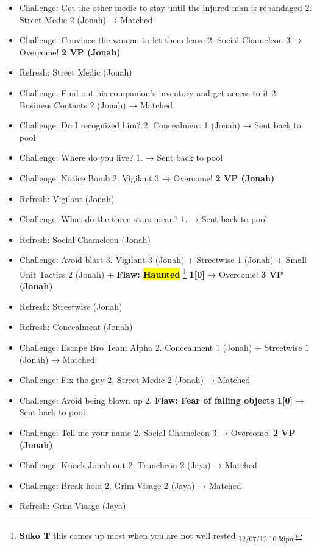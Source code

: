 {
\parskip=0pt
\begin{itemize}
\item Challenge: Get the other medic to stay until the injured man is rebandaged 2.  Street Medic 2 (Jonah) → Matched
\item Challenge: Convince the woman to let them leave 2.  Social Chameleon 3 → Overcome! \textbf{2 VP (Jonah)}
\item Refresh: Street Medic (Jonah)
\item Challenge: Find out his companion's inventory and get access to it 2. Business Contacts 2 (Jonah) → Matched
\item Challenge: Do I recognized him? 2.  Concealment 1 (Jonah) → Sent back to pool
\item Challenge: Where do you live? 1. → Sent back to pool
\item Challenge: Notice Bomb 2. Vigilant 3 → Overcome! \textbf{2 VP (Jonah)}
\item Refresh: Vigilant (Jonah)
\item Challenge: What do the three stars mean? 1. → Sent back to pool
\item Refresh: Social Chameleon (Jonah)
\item Challenge: Avoid blast 3. Vigilant 3 (Jonah) + Streetwise 1 (Jonah) + Small Unit Tactics 2 (Jonah) + \textbf{ {\color[RGB]{255,0,0}Flaw: } }\textbf{ {\color[RGB]{255,0,0}\hl{Haunted}} }\footnote{\textbf{Suko T }this comes up most when you are not well rested \textsubscript{12/07/12 10:59pm}}\textbf{ {\color[RGB]{255,0,0} 1{[}0{]}} } → Overcome! \textbf{3 VP (Jonah)}
\item Refresh: Streetwise (Jonah)
\item Refresh: Concealment (Jonah)
\item Challenge: Escape Bro Team Alpha 2. Concealment 1 (Jonah) + Streetwise 1 (Jonah) → Matched
\item Challenge: Fix the guy 2.  Street Medic 2 (Jonah) → Matched
\item Challenge: Avoid being blown up 2. \textbf{ {\color[RGB]{255,0,0}Flaw: Fear of falling objects 1{[}0{]}} } → Sent back to pool
\item Challenge: Tell me your name 2. Social Chameleon 3 → Overcome! \textbf{2 VP (Jonah)}
\item Challenge: Knock Jonah out 2. Truncheon 2 (Jaya) → Matched
\item Challenge: Break hold 2. Grim Visage 2 (Jaya) → Matched
\item Refresh: Grim Visage (Jaya)

\end{itemize}}
